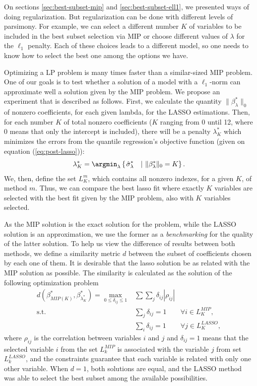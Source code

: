On sections \ref{sec:best-subset-mip} and \ref{sec:best-subset-ell1}, we presented ways of doing regularization. But regularization can be done with different levels of parsimony. For example, we can select a different number $K$ of variables to be included in the best subset selection via MIP or choose different values of $\lambda$ for the $\ell_1$ penalty. Each of these choices leads to a different model, so one needs to know how to select the best one among the options we have. 


Optimizing a LP problem is many times faster than a similar-sized MIP problem. One of our goals is to test whether a solution of a model with a $\ell_1$-norm can approximate well a solution given by the MIP problem. We propose an experiment that is described as follows. First, we calculate the quantity $\| \beta^*_\lambda \|_0$ of nonzero coefficients, for each given lambda, for the LASSO estimations.
Then, for each number $K$ of total nonzero coefficients ($K$ ranging from 0 until 12, where 0 means that only the intercept is included), there will be a penalty $\lambda^*_K$ which minimizes the errors from the quantile regression's objective function (given on equation (\ref{eq:post-lasso})):
\begin{equation}
\lambda^*_K = \argmin_\lambda \left\lbrace \left.  \hat{\sigma}_{\lambda}^{*} \quad  \right| \, \| \beta^*_\lambda \|_0 = K \right\rbrace.
\end{equation}
We, then, define the set $L_K^{m}$, which contains all nonzero indexes, for a given $K$, of method $m$.
Thus, we can compare the best lasso fit where exactly $K$ variables are selected with the best fit given by the MIP problem, also with $K$ variables selected.

As the MIP solution is the exact solution for the problem, while the LASSO solution is an approximation, we use the former as a \textit{benchmarking} for the quality of the latter solution. To help us view the difference of results between both methods, we define a similarity metric $d$ between the subset of coefficients chosen by each one of them. It is desirable that the lasso solution be as related with the MIP solution as possible.
The similarity is calculated as the solution of the following optimization problem
\begin{eqnarray}
d(\beta^*_{MIP(K)}, \beta^*_{\lambda^*_K}) =	\max_{0\leq\delta_{ij}\leq1} & \sum\sum_{j} \delta_{ij} |\rho_{ij}|\\
	\text{s.t.} & \sum_{j}\delta_{ij}=1 & \forall i\in L_{K}^{MIP},\\
	& \sum_{i}\delta_{ij}=1 & \forall j\in L_{K}^{LASSO},
\end{eqnarray}
where $\rho_{ij}$ is the correlation between variables $i$ and $j$ and $\delta_{ij} = 1$ means that the selected variable $i$ from the set $L_k^{MIP}$ is associated with the variable $j$ from set $L_k^{LASSO}$, and the constraints guarantee that each variable is related with only one other variable. 
When $d = 1$, both solutions are equal, and the LASSO method was able to select the best subset among the available possibilities.




